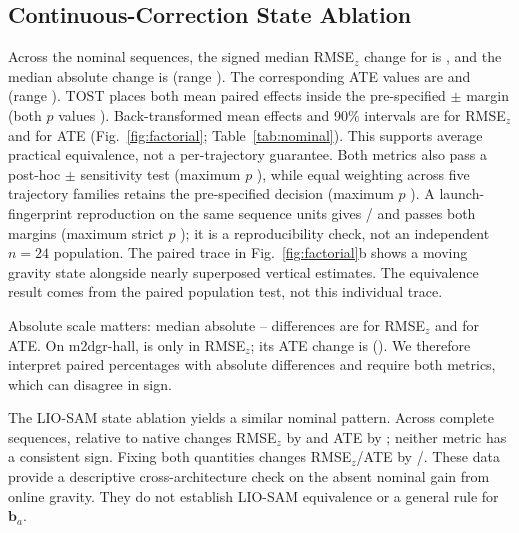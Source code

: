 \subsection{Continuous-Correction State Ablation}
Across the \NumCoreSeq{} nominal sequences, the signed median RMSE$_z$ change
for \methodG{} is \GZMedian{}, and the median absolute change is
\GZAbsMedian{} (range \GZRange{}). The corresponding ATE values are
\GATEMedian{} and \GATEAbsMedian{} (range \GATERange{}). TOST places both
mean paired effects inside the pre-specified $\pm$\EquivMargin{} margin
(both $p$ values \EquivPBoth{}). Back-transformed mean effects and 90\%
intervals are \EquivCIZ{} for RMSE$_z$ and \EquivCIATE{} for ATE
(Fig.~\ref{fig:factorial}; Table~\ref{tab:nominal}). This supports average
practical equivalence, not a per-trajectory guarantee. Both metrics also pass
a post-hoc $\pm$\StrictEquivMargin{} sensitivity test (maximum $p$
\StrictEquivPBoth{}), while equal weighting across five trajectory families
retains the pre-specified decision (maximum $p$ \FamilyEquivPBoth{}). A
launch-fingerprint reproduction on the same sequence units gives
\ReproEquivCIZ{}/\ReproEquivCIATE{} and passes both margins (maximum strict
$p$ \ReproStrictEquivPBoth{}); it is a reproducibility check, not an
independent $n=24$ population.
The paired trace in Fig.~\ref{fig:factorial}b shows a moving gravity state
alongside nearly superposed vertical estimates. The equivalence result comes
from the paired population test, not this individual trace.

Absolute scale matters: median absolute \methodG{}--\methodA{} differences
are \FixGAbsDeltaZMedian{} for RMSE$_z$ and \FixGAbsDeltaATEMedian{} for ATE.
On m2dgr-hall, \HallFixGZ{} is only \HallFixGZDeltaMm{} in RMSE$_z$; its ATE
change is \HallFixGATE{} (\HallFixGATEDeltaMm{}). We therefore interpret paired
percentages with absolute differences and require both metrics, which can
disagree in sign.

The LIO-SAM state ablation yields a similar nominal pattern. Across
\NumLioSamSeq{} complete sequences, \lsGEBA{} relative to native \lsFGBA{}
changes RMSE$_z$ by \mbox{\LioSamGZRange{}} and ATE by
\mbox{\LioSamGATERange{}}; neither metric has a consistent sign. Fixing both
quantities changes RMSE$_z$/ATE by
\mbox{\LioSamBothZRange{}}/\mbox{\LioSamBothATERange{}}. These data provide a
descriptive cross-architecture check on the absent nominal gain from online
gravity. They do not establish LIO-SAM equivalence or a general rule for
$\mathbf b_a$.

